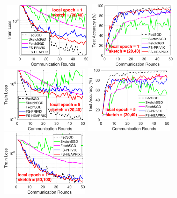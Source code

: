 \documentclass{article}
\begin{document}
\begin{figure}[t]
	\begin{center}
		\mbox{\hspace{-0.1in}			   
		\includegraphics[width=1.7in]{MNIST_figures/local1_sketch20_iid0_train_loss.eps} \hspace{-0.12in}
		\includegraphics[width=1.7in]{MNIST_figures/local1_sketch20_iid0_test_acc.eps} 
		}
		\mbox{\hspace{-0.15in}	
		\includegraphics[width=1.7in]{MNIST_figures/local5_sketch20_iid0_train_loss.eps} \hspace{-0.12in}
		\includegraphics[width=1.7in]{MNIST_figures/local5_sketch20_iid0_test_acc.eps}
		}
		\mbox{\hspace{-0.15in}	
		 \includegraphics[width=1.7in]{MNIST_figures/local1_sketch50_iid0_train_loss.eps} \hspace{-0.12in}
}
\end{center}
\end{figure}
\end{document}
